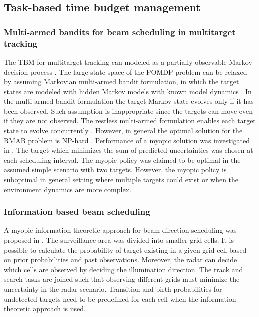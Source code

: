 \documentclass[11pt,a4paper]{article}
\begin{document}
\subsection{Task-based time budget management}

\subsubsection{Multi-armed bandits for beam scheduling in multitarget tracking}

The TBM for multitarget tracking can modeled as a partially observable Markov decision process \cite{Krishnamurthy1999, Krishnamurthy2001, Scala2006}.
The large state space of the POMDP problem can be relaxed by assuming Markovian multi-armed bandit formulation,  in which the target states are modeled with hidden Markov models with known model dynamics \cite{Krishnamurthy1999, Krishnamurthy2001}.
In the multi-armed bandit formulation the target Markov state evolves only if it has been observed.
Such assumption is inappropriate since the targets can move even if they are not observed.
The restless multi-armed formulation enables each target state to evolve concurrently \cite{Scala2006}.
However, in general the optimal solution for the RMAB problem is NP-hard \cite{Guha2007}.
Performance of a myopic solution was investigated in \cite{Scala2006}.
The target which minimizes the sum of predicted uncertainties was chosen at each scheduling interval.
The myopic policy was claimed to be optimal in the assumed simple scenario with two targets.
However, the myopic policy is suboptimal in general setting where multiple targets could exist or when the environment dynamics are more complex.

\subsubsection{Information based beam scheduling} \label{sec:inf_based}

A myopic information theoretic approach for beam direction scheduling was proposed in \cite{Kastella1997}.
The surveillance area was divided into smaller grid cells.
It is possible to calculate the probability of target existing in a given grid cell based on prior probabilities and past observations. 
Moreover, the radar can decide which cells are observed by deciding the illumination direction.
The track and search tasks are joined such that observing different grids must minimize the uncertainty in the radar scenario.
Transition and birth probabilities for undetected targets need to be predefined for each cell when the information theoretic approach is used.
\end{document}
